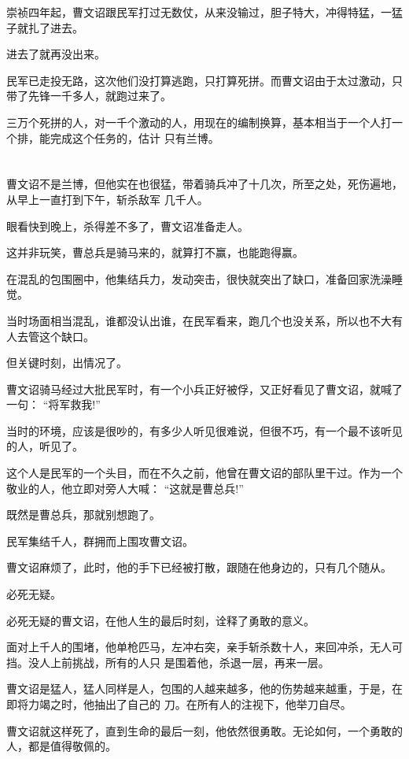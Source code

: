 \documentclass[11pt,a4paper,onecolumn]{article}
\begin{document}
崇祯四年起，曹文诏跟民军打过无数仗，从来没输过，胆子特大，冲得特猛，一猛子就扎了进去。

进去了就再没出来。

民军已走投无路，这次他们没打算逃跑，只打算死拼。而曹文诏由于太过激动，只带了先锋一千多人，就跑过来了。

三万个死拼的人，对一千个激动的人，用现在的编制换算，基本相当于一个人打一个排，能完成这个任务的，估计
只有兰博。

\section[\thesection]{}

曹文诏不是兰博，但他实在也很猛，带着骑兵冲了十几次，所至之处，死伤遍地，从早上一直打到下午，斩杀敌军
几千人。

眼看快到晚上，杀得差不多了，曹文诏准备走人。

这并非玩笑，曹总兵是骑马来的，就算打不赢，也能跑得赢。

在混乱的包围圈中，他集结兵力，发动突击，很快就突出了缺口，准备回家洗澡睡觉。

当时场面相当混乱，谁都没认出谁，在民军看来，跑几个也没关系，所以也不大有人去管这个缺口。

但关键时刻，出情况了。

曹文诏骑马经过大批民军时，有一个小兵正好被俘，又正好看见了曹文诏，就喊了一句： ``将军救我!''

当时的环境，应该是很吵的，有多少人听见很难说，但很不巧，有一个最不该听见的人，听见了。

这个人是民军的一个头目，而在不久之前，他曾在曹文诏的部队里干过。作为一个敬业的人，他立即对旁人大喊：
``这就是曹总兵!''

既然是曹总兵，那就别想跑了。

民军集结千人，群拥而上围攻曹文诏。

曹文诏麻烦了，此时，他的手下已经被打散，跟随在他身边的，只有几个随从。

必死无疑。

必死无疑的曹文诏，在他人生的最后时刻，诠释了勇敢的意义。

面对上千人的围堵，他单枪匹马，左冲右突，亲手斩杀数十人，来回冲杀，无人可挡。没人上前挑战，所有的人只
是围着他，杀退一层，再来一层。

曹文诏是猛人，猛人同样是人，包围的人越来越多，他的伤势越来越重，于是，在即将力竭之时，他抽出了自己的
刀。在所有人的注视下，他举刀自尽。

曹文诏就这样死了，直到生命的最后一刻，他依然很勇敢。无论如何，一个勇敢的人，都是值得敬佩的。
\end{document}
